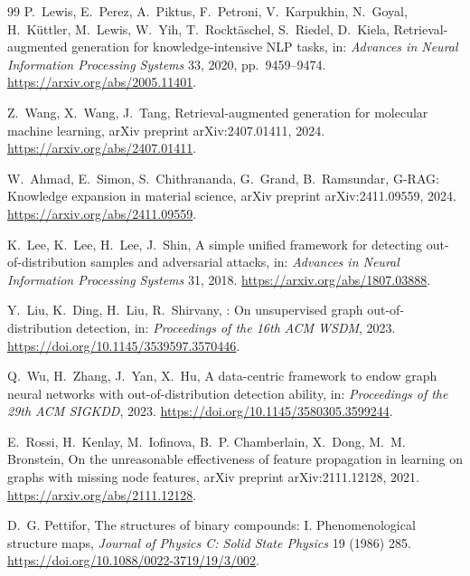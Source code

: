 \documentclass[final,5p,twocolumn,10pt]{elsarticle}
\begin{document}
\begin{thebibliography}{99}
P.~Lewis, E.~Perez, A.~Piktus, F.~Petroni, V.~Karpukhin, N.~Goyal,
H.~K\"{u}ttler, M.~Lewis, W.~Yih, T.~Rockt\"{a}schel, S.~Riedel, D.~Kiela,
\newblock Retrieval-augmented generation for knowledge-intensive {NLP} tasks,
\newblock in: \textit{Advances in Neural Information Processing Systems} 33, 2020, pp.~9459--9474.
\newblock \url{https://arxiv.org/abs/2005.11401}.

Z.~Wang, X.~Wang, J.~Tang,
\newblock Retrieval-augmented generation for molecular machine learning,
\newblock arXiv preprint arXiv:2407.01411, 2024.
\newblock \url{https://arxiv.org/abs/2407.01411}.

W.~Ahmad, E.~Simon, S.~Chithrananda, G.~Grand, B.~Ramsundar,
\newblock G-{RAG}: Knowledge expansion in material science,
\newblock arXiv preprint arXiv:2411.09559, 2024.
\newblock \url{https://arxiv.org/abs/2411.09559}.

K.~Lee, K.~Lee, H.~Lee, J.~Shin,
\newblock A simple unified framework for detecting out-of-distribution samples and adversarial attacks,
\newblock in: \textit{Advances in Neural Information Processing Systems} 31, 2018.
\newblock \url{https://arxiv.org/abs/1807.03888}.

Y.~Liu, K.~Ding, H.~Liu, R.~Shirvany,
: On unsupervised graph out-of-distribution detection,
\newblock in: \textit{Proceedings of the 16th ACM WSDM}, 2023.
\newblock \url{https://doi.org/10.1145/3539597.3570446}.

Q.~Wu, H.~Zhang, J.~Yan, X.~Hu,
\newblock A data-centric framework to endow graph neural networks with out-of-distribution detection ability,
\newblock in: \textit{Proceedings of the 29th ACM SIGKDD}, 2023.
\newblock \url{https://doi.org/10.1145/3580305.3599244}.

E.~Rossi, H.~Kenlay, M.~Iofinova, B.~P. Chamberlain, X.~Dong, M.~M. Bronstein,
\newblock On the unreasonable effectiveness of feature propagation in learning on graphs with missing node features,
\newblock arXiv preprint arXiv:2111.12128, 2021.
\newblock \url{https://arxiv.org/abs/2111.12128}.

D.~G. Pettifor,
\newblock The structures of binary compounds: {I.} Phenomenological structure maps,
\newblock \textit{Journal of Physics C: Solid State Physics} 19 (1986) 285.
\newblock \url{https://doi.org/10.1088/0022-3719/19/3/002}.


\end{thebibliography}
\end{document}
